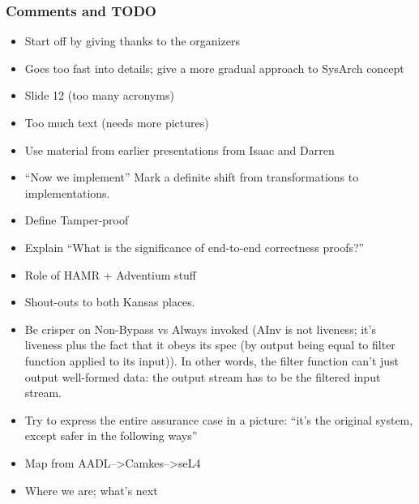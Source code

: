 \documentclass{beamer}
\begin{document}
\begin{frame}\frametitle{Comments and TODO}

\begin{itemize}
\item Start off by giving thanks to the organizers
\item Goes too fast into details; give a more gradual approach to SysArch concept
\item Slide 12 (too many acronyms)
\item Too much text (needs more pictures)
\item Use material from earlier presentations from Isaac and Darren
\item ``Now we implement'' Mark a definite shift from transformations to implementations.
\item Define Tamper-proof
\item Explain ``What is the significance of end-to-end correctness proofs?''
\item Role of HAMR + Adventium stuff
\item Shout-outs to both Kansas places.

\item Be crisper on Non-Bypass vs Always invoked (AInv is not
  liveness; it's liveness plus the fact that it obeys its spec (by
  output being equal to filter function applied to its input)). In
  other words, the filter function can't just output well-formed data:
  the output stream has to be the filtered input stream.

\item Try to express the entire assurance case in a picture: ``it's
  the original system, except safer in the following ways''

\item Map from AADL-->Camkes-->seL4
\item Where we are; what's next

\end{itemize}
\end{frame}
\end{document}
